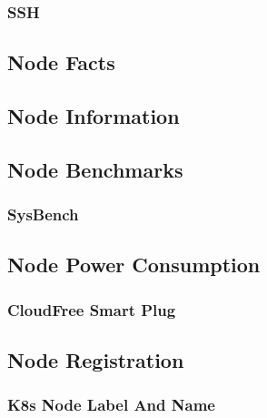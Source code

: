 \subsubsection{SSH}
\label{subsubsec:implementation_installer_configuration_files_ssh}

\subsection{Node Facts}
\label{subsec:implementation_installer_node_facts}

\subsection{Node Information}
\label{subsec:implementation_installer_node_information}

\subsection{Node Benchmarks}
\label{subsec:implementation_installer_node_benchmarks}

\subsubsection{SysBench}
\label{subsubsec:implementation_installer_node_benchmarks_sysbench}

\subsection{Node Power Consumption}
\label{subsec:implementation_installer_node_power_consumption}

\subsubsection{CloudFree Smart Plug}
\label{subsubsec:implementation_installer_node_power_consumption_cloudfree_smart_plug}

\subsection{Node Registration}
\label{subsec:implementation_installer_node_registration}

\subsubsection{K8s Node Label And Name}
\label{subsubsec:implementation_installer_node_registration_k8s_node_label_and_name}

